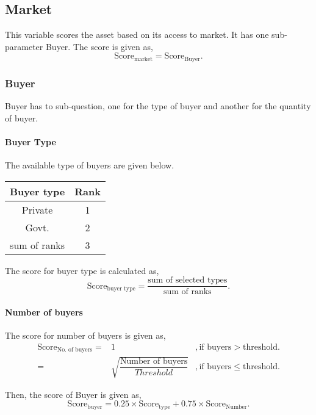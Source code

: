 \documentclass[oneside,twocolumn]{article}
\newcommand{\tsub}[2]{\text{#1}_{\text{#2}}}
\newenvironment{ttable}
               {\begin{center}
                   \begin{tabular}{c|c}
                     \hline
               }
               {\end{tabular}
                 \end{center}
               }
\begin{document}
\subsection{Market}
This variable scores the asset based on its access to market. It has one sub-parameter
Buyer. The score is given as,
\[
\tsub{Score}{market} = \tsub{Score}{Buyer}.
\]

\subsubsection{Buyer}
Buyer has to sub-question, one for the type of buyer and another for the quantity of buyer.
\paragraph{Buyer Type}
The available type of buyers are given below.
\begin{ttable}
  Buyer type & Rank \\ \hline
  Private & 1 \\
  Govt. & 2 \\ \hline
  sum of ranks & 3 \\ \hline
\end{ttable}
The score for buyer type is calculated as,
\[
\tsub{Score}{buyer type} = \dfrac{\text{sum of selected types}}{\text{sum of ranks}}.
\]

\paragraph{Number of buyers}
The score for number of buyers is given as,
\begin{align*}
  \tsub{Score}{No. of buyers} =& 1 &, \text{if buyers} > \text{threshold}. \\
  =& \sqrt{\dfrac{\text{Number of buyers}}{Threshold}} &, \text{if buyers} \leq \text{threshold}.
\end{align*}

Then, the score of Buyer is given as,
\[
\tsub{Score}{buyer} = 0.25 \times \tsub{Score}{type} + 0.75 \times \tsub{Score}{Number}.
\]
\end{document}
